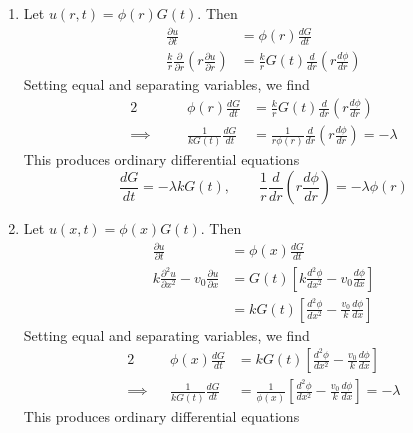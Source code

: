 \documentclass[a4paper]{article}
\begin{document}
\begin{enumerate}[label=(\alph*)]
	\item Let \( u \!\left( r,t \right) = \phi \!\left( r \right)G \!\left( t \right) \). Then
	\begin{align*}
		\frac{\partial u}{\partial t} & = \phi \!\left( r \right) \frac{d G}{d t} \\
		\frac{k}{r}\frac{\partial }{\partial r}\!\left( r \frac{\partial u}{\partial r} \right) & = \frac{k}{r}G \!\left( t \right)\frac{d}{dr}\!\left( r \frac{d \phi}{dr} \right)
	\end{align*}
	Setting equal and separating variables, we find
	\begin{alignat*}{2}
		 && \phi \!\left( r \right)\frac{d G}{d t} & = \frac{k}{r}G \!\left( t \right)\frac{d}{dr}\!\left( r \frac{d \phi}{dr} \right) \\
		\implies \quad && \frac{1}{k G \!\left( t \right)}\frac{d G}{d t} & = \frac{1}{r \phi \!\left( r \right)}\frac{d}{dr}\!\left( r \frac{d \phi}{dr} \right) = -\lambda
	\end{alignat*}
	This produces ordinary differential equations
	\[
		\frac{d G}{d t} = -\lambda k G \!\left( t \right), \qquad \frac{1}{r}\frac{d }{dr}\!\left( r \frac{d \phi}{dr} \right) = -\lambda \phi \!\left( r \right)
	\]
	\item Let \( u \!\left( x,t \right) = \phi \!\left( x \right)G \!\left( t \right) \). Then
	\begin{align*}
		\frac{\partial u}{\partial t} & = \phi \!\left( x \right)\frac{d G}{d t} \\
		k \frac{\partial^2 u}{\partial x^2} - v_{0}\frac{\partial u}{\partial x} & = G \!\left( t \right)\!\left[ k \frac{d^2 \phi}{d x^2} - v_{0}\frac{d \phi}{d x} \right] \\ 
											 & = k G \!\left( t \right)\!\left[ \frac{d^2 \phi}{d x^2} - \frac{v_{0}}{k}\frac{d \phi}{d x} \right]
	\end{align*}
	Setting equal and separating variables, we find
	\begin{alignat*}{2}
		 && \phi \!\left( x \right)\frac{d G}{d t} & = kG \!\left( t \right)\!\left[ \frac{d^2 \phi}{d x^2} - \frac{v_{0}}{k}\frac{d \phi}{d x} \right] \\
		\implies && \frac{1}{k G \!\left( t \right)}\frac{d G}{d t} & = \frac{1}{\phi \!\left( x \right)}\!\left[ \frac{d^2 \phi}{d x^2} - \frac{v_{0}}{k}\frac{d \phi}{d x} \right] = -\lambda 
	\end{alignat*}
	This produces ordinary differential equations
	\[
\]
\end{enumerate}
\end{document}
